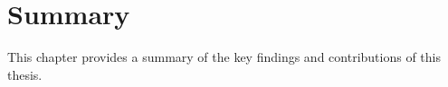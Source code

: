 \chapter{Summary}
\label{Chapter::Summary}
This chapter provides a summary of the key findings and contributions of this thesis.

